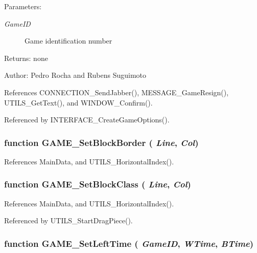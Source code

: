 \begin{Desc}
\item[Parameters:]
\begin{description}
\item[{\em GameID}]Game identification number \end{description}
\end{Desc}
\begin{Desc}
\item[Returns:]none \end{Desc}
\begin{Desc}
\item[Author:]Pedro Rocha and Rubens Suguimoto \end{Desc}


References CONNECTION\_\-SendJabber(), MESSAGE\_\-GameResign(), UTILS\_\-GetText(), and WINDOW\_\-Confirm().

Referenced by INTERFACE\_\-CreateGameOptions().
\subsubsection[GAME\_\-SetBlockBorder]{\setlength{\rightskip}{0pt plus 5cm}function GAME\_\-SetBlockBorder ( {\em Line}, \/   {\em Col})}\label{game_2game_8js_64f9afc2706e6447bba5f2754535f9cf}




References MainData, and UTILS\_\-HorizontalIndex().
\subsubsection[GAME\_\-SetBlockClass]{\setlength{\rightskip}{0pt plus 5cm}function GAME\_\-SetBlockClass ( {\em Line}, \/   {\em Col})}\label{game_2game_8js_e7e4b9971b3b19ba961a5157c10628e9}




References MainData, and UTILS\_\-HorizontalIndex().

Referenced by UTILS\_\-StartDragPiece().
\subsubsection[GAME\_\-SetLeftTime]{\setlength{\rightskip}{0pt plus 5cm}function GAME\_\-SetLeftTime ( {\em GameID}, \/   {\em WTime}, \/   {\em BTime})}\label{game_2game_8js_08312bdfab00c3105de6b5213249368d}




